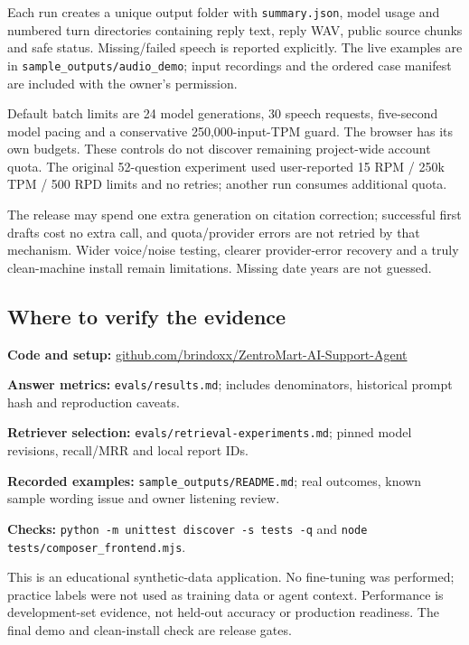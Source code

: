 \documentclass[10pt,a4paper]{article}
\newcommand{\note}[1]{\par\noindent\colorbox{mint}{\parbox{\dimexpr\linewidth-2\fboxsep}{\small #1}}\par}
\newcommand{\repo}{\href{https://github.com/brindoxx/ZentroMart-AI-Support-Agent}{github.com/brindoxx/ZentroMart-AI-Support-Agent}}
\begin{document}
Each run creates a unique output folder with \texttt{summary.json}, model usage
and numbered turn directories containing reply text, reply WAV, public source
chunks and safe status. Missing/failed speech is reported explicitly. The live
examples are in \texttt{sample\_outputs/audio\_demo}; input recordings and the
ordered case manifest are included with the owner's permission.

Default batch limits are 24 model generations, 30 speech requests, five-second
model pacing and a conservative 250,000-input-TPM guard. The browser has its own
budgets. These controls do not discover remaining project-wide account quota.
The original 52-question experiment used user-reported 15 RPM / 250k TPM / 500 RPD
limits and no retries; another run consumes additional quota.

The release may spend one extra generation on citation correction; successful
first drafts cost no extra call, and quota/provider errors are not retried by
that mechanism. Wider voice/noise testing, clearer provider-error recovery and a
truly clean-machine install remain limitations. Missing date years are not guessed.

\subsection{Where to verify the evidence}
\textbf{Code and setup:} \repo\par
\textbf{Answer metrics:} \texttt{evals/results.md}; includes denominators,
historical prompt hash and reproduction caveats.\par
\textbf{Retriever selection:} \texttt{evals/retrieval-experiments.md}; pinned
model revisions, recall/MRR and local report IDs.\par
\textbf{Recorded examples:} \texttt{sample\_outputs/README.md}; real outcomes,
known sample wording issue and owner listening review.\par
\textbf{Checks:} \texttt{python -m unittest discover -s tests -q} and
\texttt{node tests/composer\_frontend.mjs}.

\note{This is an educational synthetic-data application. No fine-tuning was
performed; practice labels were not used as training data or agent context.
Performance is development-set evidence, not held-out accuracy or production
readiness. The final demo and clean-install check are release gates.}
\end{document}
